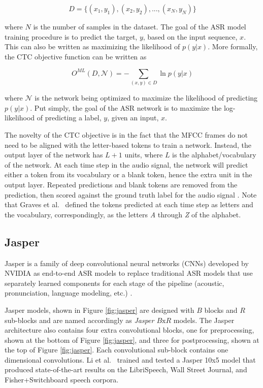 \documentclass[12pt]{article}
\begin{document}
\begin{equation}\label{eq:ctc_dataset}
    D = \{(x_1, y_1), (x_2, y_2), ..., (x_N, y_N)\}
\end{equation}

\noindent
where $N$ is the number of samples in the dataset. The goal of the ASR model training procedure is to predict the target, $y$, based on the input
sequence, $x$. This can also be written as maximizing the likelihood of $p(y|x)$. More formally, the CTC objective function can be written as

\begin{equation}\label{eq:ctc_objective}
    O^{ML}(D, \mathcal{N}) = - \sum_{(x,y) \in D} \ln p(y|x)
\end{equation}

\noindent
where $\mathcal{N}$ is the network being optimized to maximize the likelihood of predicting $p(y|x)$. Put simply, the goal of the ASR network is to
maximize the log-likelihood of predicting a label, $y$, given an input, $x$.

The novelty of the CTC objective is in the fact that the MFCC frames do not need to be aligned with the letter-based tokens to train a network.
Instead, the output layer of the network has $L + 1$ units, where $L$ is the alphabet/vocabulary of the network. At each time step in the audio
signal, the network will predict either a token from its vocabulary or a blank token, hence the extra unit in the output layer. Repeated predictions
and blank tokens are removed from the prediction, then scored against the ground truth label for the audio signal \cite{graves_connectionist_2006}.
Note that Graves et al.~\cite{graves_connectionist_2006} defined the tokens predicted at each time step as letters and the vocabulary,
correspondingly, as the letters \textit{A} through \textit{Z} of the alphabet.

\subsection{Jasper}\label{sec:jasper}
Jasper is a family of deep convolutional neural networks (CNNs) developed by NVIDIA as end-to-end ASR models to replace traditional ASR models that
use separately learned components for each stage of the pipeline (acoustic, pronunciation, language modeling, etc.) \cite{li_jasper_2019}.

Jasper models, shown in Figure \ref{fig:jasper} are designed with $B$ blocks and $R$ sub-blocks and are named accordingly as
\textit{Jasper $B\mbox{x}R$} models. The Jasper architecture also contains four extra convolutional blocks, one for preprocessing, shown at the
bottom of Figure \ref{fig:jasper}, and three for postprocessing, shown at the top of Figure \ref{fig:jasper}. Each convolutional sub-block contains
one dimensional convolutions. Li et al.~\cite{li_jasper_2019} trained and tested a Jasper 10x5 model that produced state-of-the-art results on the
LibriSpeech, Wall Street Journal, and Fisher+Switchboard speech corpora.
\end{document}
